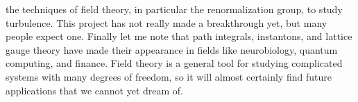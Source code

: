 the techniques of field theory, in particular the renormalization group, to
study turbulence. This project has not really made a breakthrough yet, but many
people expect one. Finally let me note that path integrals, instantons, and
lattice gauge theory have made their appearance in fields like neurobiology,
quantum computing, and finance. Field theory is a general tool for studying
complicated systems with many degrees of freedom, so it will almost certainly
find future applications that we cannot yet dream of.
